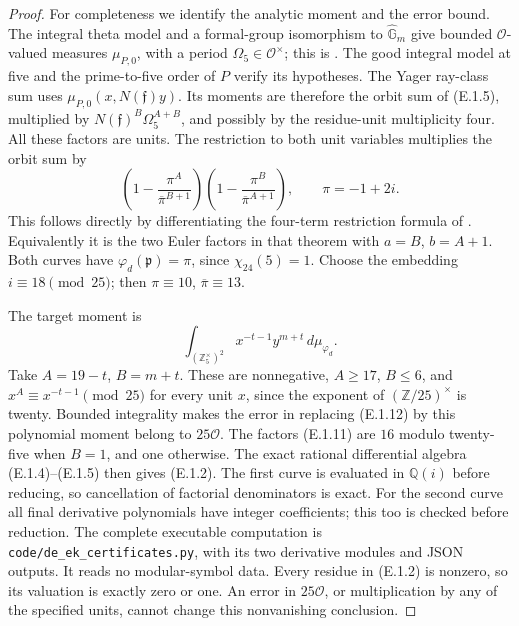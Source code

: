 \begin{proof}
For completeness we identify the analytic moment and the
error bound. The integral theta model and a formal-group
isomorphism to \(\widehat{\mathbb G}_m\) give bounded
\(\mathcal O\)-valued measures \(\mu_{P,0}\), with a period
\(\Omega_5\in\mathcal O^\times\); this is
\cite[Corollary 2.17, Definition 3.2]{DE_BannaiKobayashi2007}.
The good integral model at five and the prime-to-five order
of \(P\) verify its hypotheses. The Yager ray-class sum
uses \(\mu_{P,0}(x,N(\mathfrak f)y)\). Its moments are
therefore the orbit sum of (E.1.5), multiplied by
\(N(\mathfrak f)^B\Omega_5^{A+B}\), and possibly by the
residue-unit multiplicity four. All these factors are units.
The restriction to both unit variables multiplies the orbit
sum by
\[
 \left(1-\frac{\pi^A}{\overline\pi^{B+1}}\right)
 \left(1-\frac{\pi^B}{\overline\pi^{A+1}}\right),
 \qquad\pi=-1+2i.                                     \tag{E.1.11}
\]
This follows directly by differentiating the four-term
restriction formula of
\cite[Proposition 3.5 and the proof of Theorem 3.7]{DE_BannaiKobayashi2007}.
Equivalently it is the two Euler factors in that theorem
with \(a=B\), \(b=A+1\). Both curves have
\(\varphi_d(\mathfrak p)=\pi\), since \(\chi_{24}(5)=1\).
Choose the embedding \(i\equiv18\pmod{25}\); then
\(\pi\equiv10\), \(\overline\pi\equiv13\).

The target moment is
\[
 \int_{(\mathbb Z_5^\times)^2}x^{-t-1}y^{m+t}
                                      \,d\mu_{\varphi_d}.
                                                               \tag{E.1.12}
\]
Take \(A=19-t\), \(B=m+t\). These are nonnegative,
\(A\ge17\), \(B\le6\), and
\(x^A\equiv x^{-t-1}\pmod{25}\) for every unit \(x\),
since the exponent of \((\mathbb Z/25)^\times\) is twenty.
Bounded integrality makes the error in replacing (E.1.12)
by this polynomial moment belong to \(25\mathcal O\).
The factors (E.1.11) are \(16\) modulo twenty-five when
\(B=1\), and one otherwise.
The exact rational differential algebra (E.1.4)--(E.1.5)
then gives (E.1.2). The first curve is evaluated in
\(\mathbb Q(i)\) before reducing, so cancellation of
factorial denominators is exact. For the second curve all
final derivative polynomials have integer coefficients;
this too is checked before reduction. The complete
executable computation is
\texttt{code/de\_ek\_certificates.py}, with its two derivative
modules and JSON outputs. It reads no modular-symbol data.
Every residue in (E.1.2) is nonzero, so its valuation is
exactly zero or one. An error in \(25\mathcal O\), or
multiplication by any of the specified units, cannot
change this nonvanishing conclusion.


\end{proof}
